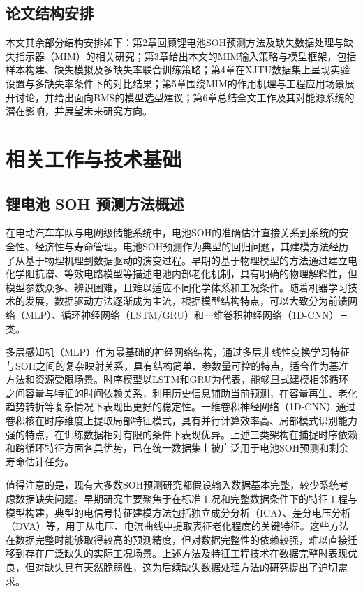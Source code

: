 \documentclass[10pt,a4paper]{ctexart}
\begin{document}
\subsection{论文结构安排}

本文其余部分结构安排如下：第2章回顾锂电池SOH预测方法及缺失数据处理与缺失指示器（MIM）的相关研究；第3章给出本文的MIM输入策略与模型框架，包括样本构建、缺失模拟及多缺失率联合训练策略；第4章在XJTU数据集上呈现实验设置与多缺失率条件下的对比结果；第5章围绕MIM的作用机理与工程应用场景展开讨论，并给出面向BMS的模型选型建议；第6章总结全文工作及其对能源系统的潜在影响，并展望未来研究方向。

\section{相关工作与技术基础}\label{sec:related}

\subsection{锂电池 SOH 预测方法概述}

在电动汽车车队与电网级储能系统中，电池SOH的准确估计直接关系到系统的安全性、经济性与寿命管理。电池SOH预测作为典型的回归问题，其建模方法经历了从基于物理机理到数据驱动的演变过程\cite{liu2025deep}。早期的基于物理模型的方法通过建立电化学阻抗谱、等效电路模型等描述电池内部老化机制，具有明确的物理解释性，但模型参数众多、辨识困难，且难以适应不同化学体系和工况条件。随着机器学习技术的发展，数据驱动方法逐渐成为主流\cite{liu2025deep}，根据模型结构特点，可以大致分为前馈网络（MLP）、循环神经网络（LSTM/GRU）和一维卷积神经网络（1D-CNN）三类。

多层感知机（MLP）作为最基础的神经网络结构，通过多层非线性变换学习特征与SOH之间的复杂映射关系，具有结构简单、参数量可控的特点，适合作为基准方法和资源受限场景\cite{bairwa2025cycle}。时序模型以LSTM和GRU为代表，能够显式建模相邻循环之间容量与特征的时间依赖关系，利用历史信息辅助当前预测，在容量再生、老化趋势转折等复杂情况下表现出更好的稳定性。一维卷积神经网络（1D-CNN）通过卷积核在时序维度上提取局部特征模式，具有并行计算效率高、局部模式识别能力强的特点，在训练数据相对有限的条件下表现优异\cite{zhang2024cnnsoh}。上述三类架构在捕捉时序依赖和跨循环特征方面各具优势，已在统一数据集上被广泛用于电池SOH预测和剩余寿命估计任务\cite{bairwa2025cycle}。

值得注意的是，现有大多数SOH预测研究都假设输入数据基本完整，较少系统考虑数据缺失问题\cite{shao2025soh,deng2025novel}。早期研究主要聚焦于在标准工况和完整数据条件下的特征工程与模型构建，典型的电信号特征建模方法包括独立成分分析（ICA）、差分电压分析（DVA）等，用于从电压、电流曲线中提取表征老化程度的关键特征\cite{deng2025novel}。这些方法在数据完整时能够取得较高的预测精度，但对数据完整性的依赖较强，难以直接迁移到存在广泛缺失的实际工况场景。上述方法及特征工程技术在数据完整时表现优良，但对缺失具有天然脆弱性，这为后续缺失数据处理方法的研究提出了迫切需求。
\end{document}
